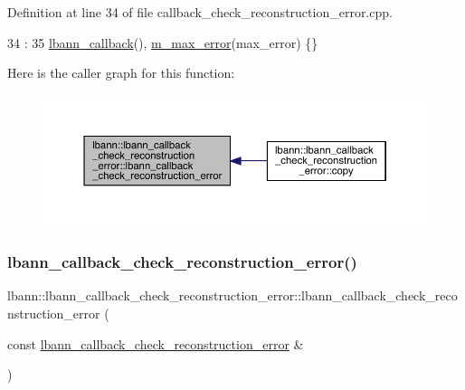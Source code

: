 Definition at line 34 of file callback\+\_\+check\+\_\+reconstruction\+\_\+error.\+cpp.


\begin{DoxyCode}
34                                                                                                        :
35   \hyperlink{classlbann_1_1lbann__callback_a679057298a41ddd47f08c157f756c584}{lbann\_callback}(), \hyperlink{classlbann_1_1lbann__callback__check__reconstruction__error_a04e779b9e10a909f63f941ea036b3ef4}{m\_max\_error}(max\_error) \{\}
\end{DoxyCode}
Here is the caller graph for this function\+:\nopagebreak
\begin{figure}[H]
\begin{center}
\leavevmode
\includegraphics[width=350pt]{classlbann_1_1lbann__callback__check__reconstruction__error_aaed51def6fe5ba7093e3d2cc41637a2a_icgraph}
\end{center}
\end{figure}
\mbox{\label{classlbann_1_1lbann__callback__check__reconstruction__error_ad277f418a2c28db941ab44398ee8be5e}} 
\subsubsection{\texorpdfstring{lbann\+\_\+callback\+\_\+check\+\_\+reconstruction\+\_\+error()}{lbann\_callback\_check\_reconstruction\_error()}\hspace{0.1cm}{\footnotesize\ttfamily [2/2]}}
{\footnotesize\ttfamily lbann\+::lbann\+\_\+callback\+\_\+check\+\_\+reconstruction\+\_\+error\+::lbann\+\_\+callback\+\_\+check\+\_\+reconstruction\+\_\+error (\begin{DoxyParamCaption}\item[{const \hyperlink{classlbann_1_1lbann__callback__check__reconstruction__error}{lbann\+\_\+callback\+\_\+check\+\_\+reconstruction\+\_\+error} \&}]{ }\end{DoxyParamCaption})\hspace{0.3cm}{\ttfamily [default]}}



